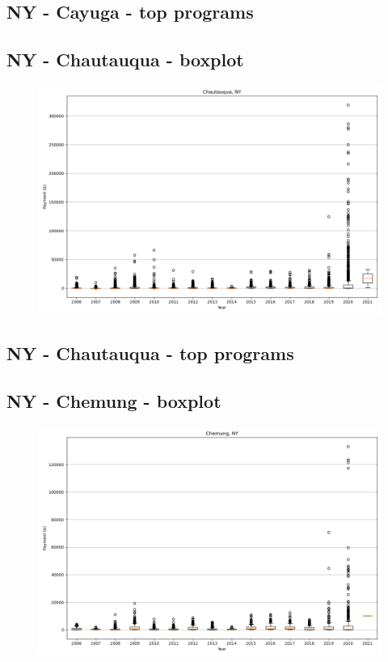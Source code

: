 \subsection*{NY - Cayuga - top programs}

\newpage
\subsection*{NY - Chautauqua - boxplot}
\begin{figure}[h]
\centering
\includegraphics[width=7in]{../output/boxplots/counties/Chautauqua-NY_boxplot.png}
\end{figure}


\subsection*{NY - Chautauqua - top programs}

\newpage
\subsection*{NY - Chemung - boxplot}
\begin{figure}[h]
\centering
\includegraphics[width=7in]{../output/boxplots/counties/Chemung-NY_boxplot.png}
\end{figure}


